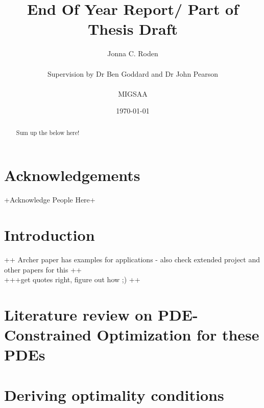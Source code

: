 \documentclass[11pt, a4paper]{article}
\title{End Of Year Report/ Part of Thesis Draft}
\author{Jonna C. Roden\\ \\Supervision by Dr Ben Goddard and Dr John Pearson\\ \\ \vspace{0.5cm} MIGSAA}
\date{\today}
\theoremstyle{definition}
\begin{document}
	
	\maketitle
	\begin{abstract}
		Sum up the below here!
		
	\end{abstract}
	
	\newpage
	\section*{Acknowledgements}
	+Acknowledge People Here+
	\newpage
	\tableofcontents
	\newpage
















\section{Introduction}
++ Archer paper has examples for applications - also check extended project and other papers for this ++\\
+++get quotes right, figure out how ;) ++

\section{Literature review on PDE-Constrained Optimization for these PDEs}

\section{Deriving optimality conditions}
\end{document}

